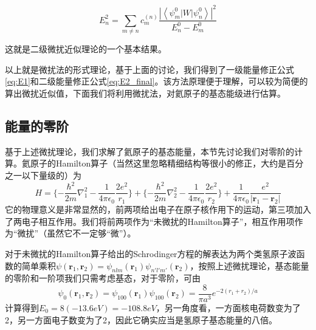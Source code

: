 \begin{equation}
	E_n^2 = \sum_{m\ne n} c_m^{(n)} \frac{| \left \langle  \psi_m^0|W | \psi_n^0 \right \rangle |^2 }{E_n^0 -E_m^0}
	\label{eq:E2_final}
\end{equation}

这就是二级微扰近似理论的一个基本结果。

以上就是微扰法的形式理论，基于上面的讨论，我们得到了一级能量修正公式\cref{eq:E1}和二级能量修正公式\cref{eq:E2_final}。该方法原理便于理解，可以较为简便的算出微扰近似值，下面我们将利用微扰法，对氦原子的基态能级进行估算。


\subsection{能量的零阶}
基于上述微扰理论，我们求解了氦原子的基态能量，本节先讨论我们对零阶的计算。氦原子的Hamilton算子（当然这里忽略精细结构等很小的修正，大约是百分之一以下量级的）为
\begin{equation}\label{eq1}
	H=\{-\frac{\hbar^2}{2m}\nabla_1^2-\frac{1}{4\pi\epsilon_0}\frac{2e^2}{r_1}\}+\{-\frac{\hbar^2}{2m}\nabla_2^2-\frac{1}{4\pi\epsilon_0}\frac{2e^2}{r_2}\}+\frac{1}{4\pi\epsilon_0}\frac{e^2}{\left|\textbf{r}_1-\textbf{r}_2\right|}
\end{equation}
它的物理意义是非常显然的，前两项给出电子在原子核作用下的运动，第三项加入了两电子相互作用。我们将前两项作为“未微扰的Hamilton算子”，相互作用项作为“微扰”（虽然它不一定够“微”）。

对于未微扰的Hamilton算子给出的Schrodinger方程的解表达为两个类氢原子波函数的简单乘积$\psi(\textbf{r}_1,\textbf{r}_2)=\psi_{nlm}(\textbf{r}_1)\psi_{n'l'm'}(\textbf{r}_2)$，按照上述微扰理论，基态能量的零阶和一阶项我们只需考虑基态，对于零阶，可由
\begin{equation}\label{eq2}
	\psi_0(\textbf{r}_1,\textbf{r}_2)=\psi_{100}(\textbf{r}_1)\psi_{100}(\textbf{r}_2)=\frac{8}{\pi a^3}e^{-2(r_1+r_2)/a}
\end{equation}
计算得到$E_0=8(-13.6eV)=-108.8eV$，另一角度看，一方面核电荷数变为了2，另一方面电子数变为了2，因此它确实应当是氢原子基态能量的八倍。


